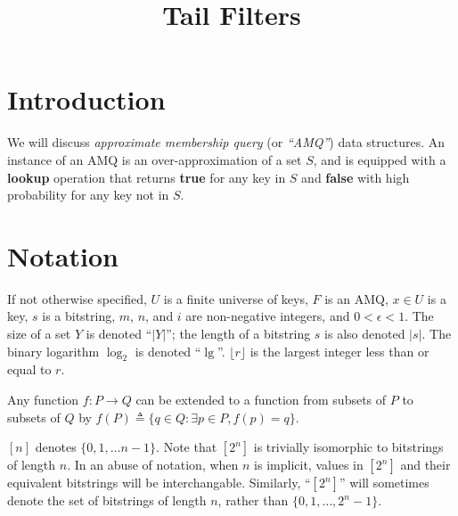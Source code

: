 \documentclass[letterpaper]{article}
\begin{document}
\title{Tail Filters}
\maketitle

\section{Introduction}

We will discuss {\em approximate membership query} (or {\em ``AMQ''}) data structures.
An instance of an AMQ is an over-approximation of a set $S$, and is equipped with a {\bf lookup} operation that returns {\bf true} for any key in $S$ and {\bf false} with high probability for any key not in $S$.

\section{Notation}

If not otherwise specified, $U$ is a finite universe of keys, $F$ is an AMQ, $x \in U$ is a key, $s$ is a bitstring, $m$, $n$, and $i$ are non-negative integers, and $0 < \epsilon < 1$.
The size of a set $Y$ is denoted ``$|Y|$''; the length of a bitstring $s$ is also denoted $|s|$.
The binary logarithm $\log_2$ is denoted ``$\lg$''.
$\lfloor r \rfloor$ is the largest integer less than or equal to $r$.

Any function $f: P \to Q$ can be extended to a function from subsets of $P$ to subsets of $Q$ by $f(P) \triangleq \{ q \in Q: \exists p \in P, f(p) = q\}$.

$[n]$ denotes $\{0, 1, \dots n - 1 \}$.
Note that $[2^n]$ is trivially isomorphic to bitstrings of length $n$.
In an abuse of notation, when $n$ is implicit, values in $[2^n]$ and their equivalent bitstrings will be interchangable.
Similarly, ``$[2^n]$'' will sometimes denote the set of bitstrings of length $n$, rather than $\{0, 1, \dots, 2^n - 1\}$.


\end{document}
